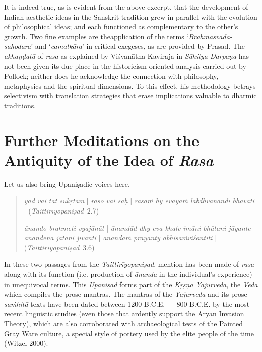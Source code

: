 It is indeed true, as is evident from the above excerpt, that the development of Indian aesthetic ideas in the Sanskrit tradition grew in parallel with the evolution of philosophical ideas; and each functioned as complementary to the other’s growth. Two fine examples are the\break application of the terms ‘\textsl{Brahmāsvāda-sahodara}’ and ‘\textsl{camatkāra}’ in critical exegeses, as are provided by Prasad. The \textsl{akhaṇḍatā} of \textsl{rasa} as explained by Viśvanātha Kaviraja in \textsl{Sāhitya Darpaṇa} has not been given its due place in the historicism-oriented analysis carried out by Pollock; neither does he acknowledge the connection with philosophy, metaphysics and the spiritual dimensions. To this effect, his methodology  betrays selectivism with translation strategies that erase implications valuable to dharmic traditions.\\[-21pt]  

\section*{Further Meditations on the Antiquity of the Idea of \textsl{Rasa}}

Let us also bring Upaniṣadic voices here. 
\begin{quote}
\textsl{yad vai tat sukṛtam} | \textsl{raso vai saḥ} | \textsl{rasaṁ hy evāyaṁ labdhvānandī bhavati} | 
\hfill\hbox{(\textsl{Taittirīyopaniṣad}
 2.7)}

\textsl{ānando brahmeti vyajānāt} | \textsl{ānandād dhy eva khalv imāni bhūtani jāyante} | \textsl{ānandena jātāni jīvanti} | \textsl{ānandaṁ prayanty abhisaṁviśantīti} | 
\hfill\hbox{(\textsl{Taittirīyopaniṣad} 3.6)}
\end{quote}

In these two passages from the \textsl{Taittirīyopaniṣad}, mention has been made of \textsl{rasa} along with its function (i.e. production of \textsl{ānanda} in the individual’s experience) in unequivocal terms. This \textsl{Upaniṣad} forms part of the \textsl{Kṛṣṇa Yajurveda}, the \textsl{Veda} which compiles the prose mantras. The mantras of the \textsl{Yajurveda} and its prose \textsl{saṁhitā} texts have been dated between 1200 B.C.E. --- 800 B.C.E. by the most recent linguistic studies (even those that ardently support the Aryan Invasion Theory), which are also corroborated with archaeological tests of the Painted Gray Ware culture, a special style of pottery used by the elite people of the time (Witzel 2000). 

